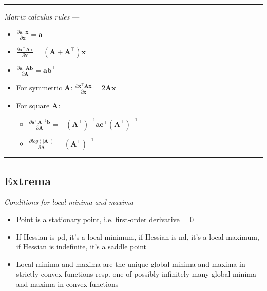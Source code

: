 {\color{lightgray}\hrule height 0.001mm}

\emph{Matrix calculus rules} --- 
\begin{multicols}{2}
\begin{itemize}
    \item $\frac{\partial \boldsymbol{a}^\intercal\boldsymbol{x}}{\partial \boldsymbol{x}} = \boldsymbol{a}$
    \item $\frac{\partial \boldsymbol{x}^\intercal\boldsymbol{A}\boldsymbol{x}}{\partial \boldsymbol{x}} = (\boldsymbol{A} + \boldsymbol{A}^\intercal)\boldsymbol{x}$
    \item $\frac{\partial \boldsymbol{a}^\intercal\boldsymbol{A}\boldsymbol{b}}{\partial \boldsymbol{A}} = \boldsymbol{a}\boldsymbol{b}^\intercal$
    \item For symmetric $\boldsymbol{A}$: $\frac{\partial \boldsymbol{x}^\intercal\boldsymbol{A}\boldsymbol{x}}{\partial \boldsymbol{x}} = 2\boldsymbol{A}\boldsymbol{x}$
    \item For square $\boldsymbol{A}$: 
    \begin{itemize}
        \item $\frac{\partial \boldsymbol{a}^\intercal\boldsymbol{A}^{-1}\boldsymbol{b}}{\partial \boldsymbol{A}} = -(\boldsymbol{A}^\intercal)^{-1} \boldsymbol{a}\boldsymbol{c}^\intercal (\boldsymbol{A}^\intercal)^{-1}$
        \item $\frac{\partial log(|\boldsymbol{A}|)}{\partial \boldsymbol{A}} = (\boldsymbol{A}^\intercal)^{-1}$
    \end{itemize}
\end{itemize}
\end{multicols}

{\color{black}\hrule height 0.001mm}

\subsection*{Extrema}
\emph{Conditions for local minima and maxima} --- 
\begin{itemize}
    \item Point is a stationary point, i.e. first-order derivative = 0
    \item If Hessian is pd, it's a local minimum, if Hessian is nd, it's a local maximum, if Hessian is indefinite, it's a saddle point
    \item Local minima and maxima are the unique global minima and maxima in strictly convex functions resp. one of possibly infinitely many global minima and maxima in convex functions
\end{itemize}

